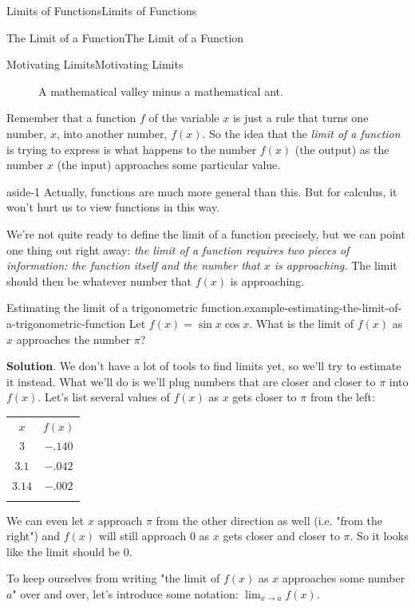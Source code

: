 \documentclass[10pt,]{book}
\numberwithin{equation}{section}
\newcommand{\hrulethin}  {\noalign{\hrule height 0.04em}}
\newcommand{\hrulethick} {\noalign{\hrule height 0.11em}}
\begin{document}
\begin{chapterptx}{Limits of Functions}{}{Limits of Functions}{}{}
\begin{sectionptx}{The Limit of a Function}{}{The Limit of a Function}{}{}
\begin{subsectionptx}{Motivating Limits}{}{Motivating Limits}{}{}
\begin{figure}
\caption{A mathematical valley minus a mathematical ant.\label{figure-math-valley}}
\end{figure}
\hypertarget{p-3}{}%
Remember that a function \(f\) of the variable \(x\) is just a rule that turns one number, \(x\), into another number, \(f(x)\). So the idea that the \emph{limit of a function} is trying to express is what happens to the number \(f(x)\) (the output) as the number \(x\) (the input) approaches some particular value.%
\begin{aside}{}{aside-1}%
\hypertarget{p-4}{}%
Actually, functions are much more general than this. But for calculus, it won't hurt us to view functions in this way.%
\end{aside}
\hypertarget{p-5}{}%
We're not quite ready to define the limit of a function precisely, but we can point one thing out right away: \emph{the limit of a function requires two pieces of information: the function itself and the number that \(x\) is approaching.} The limit should then be whatever number that \(f(x)\) is approaching.%
\begin{example}{Estimating the limit of a trigonometric function.}{example-estimating-the-limit-of-a-trigonometric-function}%
\hypertarget{p-6}{}%
Let \(f(x) = \sin x\cos x\). What is the limit of \(f(x)\) as \(x\) approaches the number \(\pi\)?%
\par\smallskip%
\noindent\textbf{Solution}.\hypertarget{solution-1}{}\quad%
\hypertarget{p-7}{}%
We don't have a lot of tools to find limits yet, so we'll try to estimate it instead. What we'll do is we'll plug numbers that are closer and closer to \(\pi\) into \(f(x)\). Let's list several values of \(f(x)\) as \(x\) gets closer to \(\pi\) from the left:%
\begin{table}
\centering
\begin{tabular}{cc}\hrulethick
\(x\)&\(f(x)\)\tabularnewline\hrulethin
\(3\)&\(-.140\)\tabularnewline[0pt]
\(3.1\)&\(-.042\)\tabularnewline[0pt]
\(3.14\)&\(-.002\)\tabularnewline\hrulethick
\end{tabular}
\end{table}
\hypertarget{p-8}{}%
We can even let \(x\) approach \(\pi\) from the other direction as well (i.e. "from the right") and \(f(x)\) will still approach \(0\) as \(x\) gets closer and closer to \(\pi\). So it looks like the limit should be \(0\).%
\end{example}
\hypertarget{p-9}{}%
To keep ourselves from writing "the limit of \(f(x)\) as \(x\) approaches some number \(a\)" over and over, let's introduce some notation: \(\lim_{x\to a}f(x)\).%

\end{subsectionptx}
\end{sectionptx}
\end{chapterptx}
\end{document}
